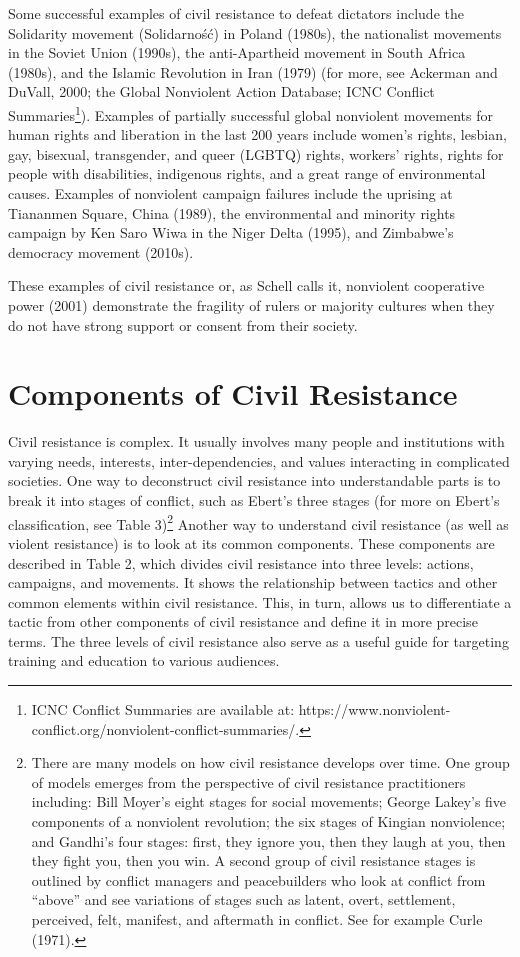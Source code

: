 \documentclass[twoside,a4paper,12pt,fleqn,openany]{extbook}
\begin{document}
Some successful examples of civil resistance to defeat dictators include the Solidarity movement (Solidarność) in Poland (1980s), the nationalist movements in the Soviet Union (1990s), the anti-Apartheid movement in South Africa (1980s), and the Islamic Revolution in Iran (1979) (for more, see Ackerman and DuVall, 2000; the Global Nonviolent Action Database; ICNC Conflict Summaries\footnote{ICNC Conflict Summaries are available at: https://www.nonviolent-conflict.org/nonviolent-conflict-summaries/.}). Examples of partially successful global nonviolent movements for human rights and liberation in the last 200 years include women’s rights, lesbian, gay, bisexual, transgender, and queer (LGBTQ) rights, workers’ rights, rights for people with disabilities, indigenous rights, and a great range of environmental causes. Examples of nonviolent campaign failures include the uprising at Tiananmen Square, China (1989), the environmental and minority rights campaign by Ken Saro Wiwa in the Niger Delta (1995), and Zimbabwe’s democracy movement (2010s).

These examples of civil resistance or, as Schell calls it, nonviolent cooperative power (2001) demonstrate the fragility of rulers or majority cultures when they do not have strong support or consent from their society.

\section*{Components of Civil Resistance}

Civil resistance is complex. It usually involves many people and institutions with varying needs, interests, inter-dependencies, and values interacting in complicated societies. One way to deconstruct civil resistance into understandable parts is to break it into stages of conflict, such as Ebert’s three stages (for more on Ebert’s classification, see Table 3)\footnote{There are many models on how civil resistance develops over time. One group of models emerges from the perspective of civil resistance practitioners including: Bill Moyer’s eight stages for social movements; George Lakey’s five components of a nonviolent revolution; the six stages of Kingian nonviolence; and Gandhi’s four stages: first, they ignore you, then they laugh at you, then they fight you, then you win. A second group of civil resistance stages is outlined by conflict managers and peacebuilders who look at conflict from “above” and see variations of stages such as latent, overt, settlement, perceived, felt, manifest, and aftermath in conflict. See for example Curle (1971).} Another way to understand civil resistance (as well as violent resistance) is to look at its common components. These components are described in Table 2, which divides civil resistance into three levels: actions, campaigns, and movements. It shows the relationship between tactics and other common elements within civil resistance. This, in turn, allows us to differentiate a tactic from other components of civil resistance and define it in more precise terms. The three levels of civil resistance also serve as a useful guide for targeting training and education to various audiences.
\end{document}
